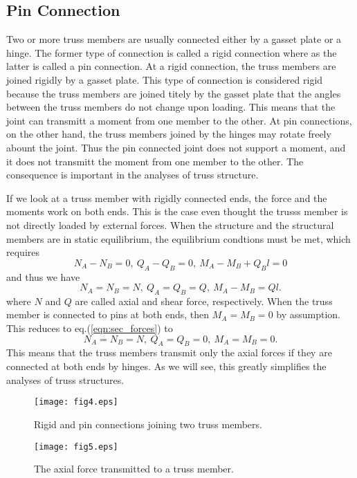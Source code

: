 \documentclass[10pt,a4j]{article}
\begin{document}
\subsection{Pin Connection}
Two or more truss members are usually connected either by a gasset plate or a hinge. 
The former type of connection is called a rigid connection where as the latter 
is called a pin connection.
At a rigid connection, the truss members are joined rigidly by a gasset plate.
This type of connection is considered rigid because the truss members are joined 
titely by the gasset plate that the angles between the truss members do not 
change upon loading. 
This means that the joint can transmitt a moment from one member to the other. 
At pin connections, on the other hand, the truss members joined by the 
hinges may rotate freely abount the joint. 
Thus the pin connected joint does not support a moment, and it does not 
transmitt the moment from one member to the other. 
The consequence is important in the analyses of truss structure. 

If we look at a truss member with rigidly connected ends, 
the force and the moments work on both ends. This is the case 
even thought the trusss member is not directly loaded by external forces. 
When the structure and the structural members are in static equilibrium, the 
equilibrium condtions must be met, which requires
\begin{equation}
	N_A-N_B=0, \ Q_A-Q_B=0, \  M_A-M_B+Q_Bl=0 
	\label{eqn:}
\end{equation}
\begin{equation}
\end{equation}
and thus we have
\begin{equation}
	N_A=N_B=N,\  Q_A=Q_B=Q, \  M_A-M_B=Ql.
	\label{eqn:sec_forces}
\end{equation}
where $N$ and $Q$ are called axial and shear force, respectively.
When the truss member is connected to pins at both ends, then 
$M_A=M_B=0$ by assumption. This reduces to eq.(\ref{eqn:sec_forces}) 
to 
\begin{equation}
	N_A=N_B=N,\  Q_A=Q_B=0, \  M_A=M_B=0.
	\label{eqn:sec_forces}
\end{equation}
This means that the truss members transmit only the axial forces 
 if they are connected at both ends by hinges. As we will see, this 
 greatly simplifies the analyses of truss structures. 
\begin{figure}[h]
	\begin{center}
	\texttt{[image: fig4.eps]} 
	\end{center}
	\caption{Rigid and pin connections joining two truss members.} 
	\label{fig:fig4}
\end{figure}
\begin{figure}[h]
	\begin{center}
	\texttt{[image: fig5.eps]} 
	\end{center}
	\caption{The axial force transmitted to a truss member.}
	\label{fig:fig5}
\end{figure}
%
%
\end{document}

